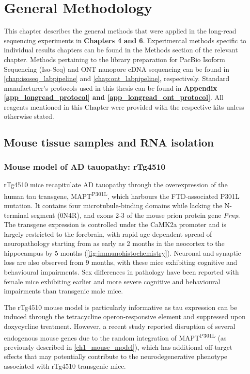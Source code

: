 \cleardoublepage
\chapter{General Methodology}\label{ch: general methodology}

This chapter describes the general methods that were applied in the long-read sequencing experiments in \textbf{Chapters 4 and 6}. Experimental methods specific to individual results chapters can be found in the Methods section of the relevant chapter. Methods pertaining to the library preparation for PacBio Isoform Sequencing (Iso-Seq) and ONT nanopore cDNA sequencing can be found in \cref{chap:isoseq_labpipeline} and \cref{chap:ont_labpipeline}, respectively. Standard manufacturer's protocols used in this thesis can be found in \textbf{Appendix \ref{app_longread_protocol} and \ref{app_longread_ont_protocol}}. All reagents mentioned in this Chapter were provided with the respective kits unless otherwise stated.

\section{Mouse tissue samples and RNA isolation}

\subsection{Mouse model of AD tauopathy: rTg4510} 
\label{ch2: rtg4510}
rTg4510 mice recapitulate AD tauopathy through the overexpression of the human tau transgene, MAPT\textsuperscript{P301L}, which harbours the FTD-associated P301L mutation. It contains four microtubule-binding domains while lacking the N-terminal segment (0N4R), and exons 2-3 of the mouse prion protein gene \textit{Prnp}. The transgene expression is controlled under the CaMK2a promoter and is largely restricted to the forebrain, with rapid age-dependent spread of neuropathology starting from as early as 2 months in the neocortex to the hippocampus by 5 months (\cref{fig:immunohistochemistry}). Neuronal and synaptic loss are also observed from 9 months, with these mice exhibiting cognitive and behavioural impairments. Sex differences in pathology have been reported with female mice exhibiting earlier and more severe cognitive and behavioural impairments than transgenic male mice\cite{M2011}. 

The rTg4510 mouse model is particularly informative as tau expression can be induced through the tetracycline operon-responsive element and suppressed upon doxycycline treatment\cite{Ramsden2005}. However, a recent study reported disruption of several endogenous mouse genes due to the random integration of MAPT\textsuperscript{P301L} (as previously described in \cref{ch1_mouse_model}), which has additional off-target effects that may potentially contribute to the neurodegenerative phenotype associated with rTg4510 transgenic mice\cite{Gamache2019}. 
 

